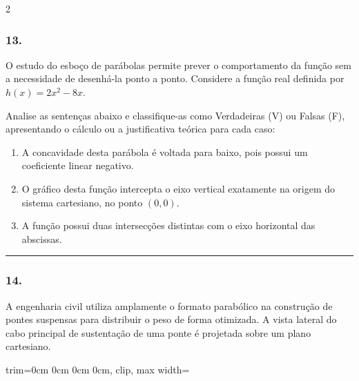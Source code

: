 \documentclass[twoside, 10pt, a4paper]{article}
\newlength{\espacoPreQuestao}
\newlength{\espacoQuestao}
\newlength{\larguraTikz}
\begin{document}
\begin{multicols*}{2}
\subsubsection*{13.} O estudo do esboço de parábolas permite prever o comportamento da função sem a necessidade de desenhá-la ponto a ponto. Considere a função real definida por $h(x) = 2x^2 - 8x$.

Analise as sentenças abaixo e classifique-as como Verdadeiras (V) ou Falsas (F), apresentando o cálculo ou a justificativa teórica para cada caso:

\begin{enumerate}[label=\Roman*.]
    \item A concavidade desta parábola é voltada para baixo, pois possui um coeficiente linear negativo.
    \item O gráfico desta função intercepta o eixo vertical exatamente na origem do sistema cartesiano, no ponto $(0, 0)$.
    \item A função possui duas intersecções distintas com o eixo horizontal das abscissas.
\end{enumerate}
\par\vspace{\espacoQuestao}

\noindent\textcolor{CorLinha}{\rule{\linewidth}{0.5pt}} 
\par\vspace{\espacoPreQuestao}
\subsubsection*{14.} A engenharia civil utiliza amplamente o formato parabólico na construção de pontes suspensas para distribuir o peso de forma otimizada. A vista lateral do cabo principal de sustentação de uma ponte é projetada sobre um plano cartesiano.

\begin{center}
\begin{adjustbox}{trim=0cm 0cm 0cm 0cm, clip, max width=\larguraTikz}
\end{adjustbox}
\end{center}
\end{multicols*}
\end{document}
